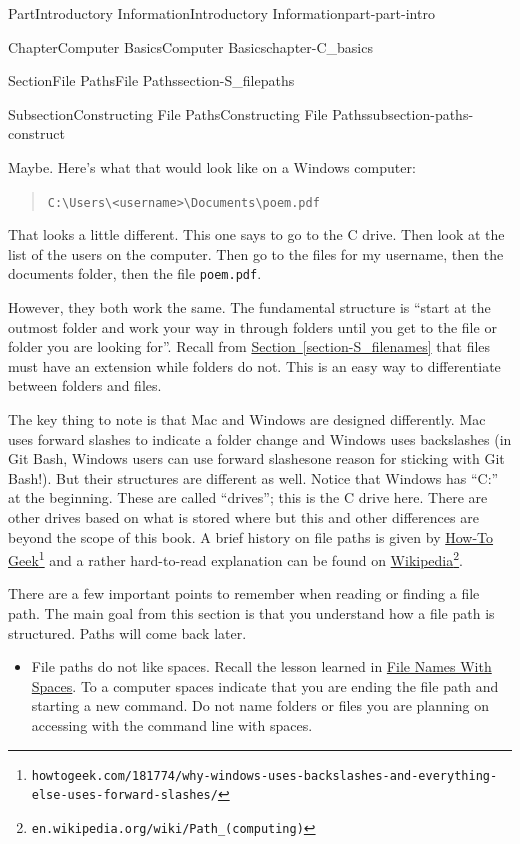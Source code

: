 \documentclass[oneside,10pt,]{book}
\newcommand{\xreffont}{\relax}
\newcommand{\mono}[1]{\texttt{#1}}
\begin{document}
\begin{partptx}{Part}{Introductory Information}{}{Introductory Information}{}{}{part-part-intro}
\begin{chapterptx}{Chapter}{Computer Basics}{}{Computer Basics}{}{}{chapter-C_basics}
\begin{sectionptx}{Section}{File Paths}{}{File Paths}{}{}{section-S_filepaths}
\begin{subsectionptx}{Subsection}{Constructing File Paths}{}{Constructing File Paths}{}{}{subsection-paths-construct}
\par
Maybe. Here's what that would look like on a Windows computer:%
\begin{quote}%
\mono{C:\textbackslash{}Users\textbackslash{}<username>\textbackslash{}Documents\textbackslash{}poem.pdf}%
\end{quote}
That looks a little different. This one says to go to the C drive. Then look at the list of the users on the computer. Then go to the files for my username, then the documents folder, then the file \mono{poem.pdf}.%
\par
However, they both work the same. The fundamental structure is ``start at the outmost folder and work your way in through folders until you get to the file or folder you are looking for''. Recall from \hyperref[section-S_filenames]{Section~{\xreffont\ref{section-S_filenames}}} that files must have an extension while folders do not. This is an easy way to differentiate between folders and files.%
\par
The key thing to note is that Mac and Windows are designed differently. Mac uses forward slashes to indicate a folder change and Windows uses backslashes (in Git Bash, Windows users can use forward slashes\textellipsis{}one reason for sticking with Git Bash!). But their structures are different as well. Notice that Windows has ``C:'' at the beginning. These are called ``drives''; this is the C drive here. There are other drives based on what is stored where but this and other differences are beyond the scope of this book. A brief history on file paths is given by \href{https://www.howtogeek.com/181774/why-windows-uses-backslashes-and-everything-else-uses-forward-slashes/}{How-To Geek}\footnote{\nolinkurl{howtogeek.com/181774/why-windows-uses-backslashes-and-everything-else-uses-forward-slashes/}\label{fn-paths-construct-l-e}} and a rather hard-to-read explanation can be found on \href{https://en.wikipedia.org/wiki/Path_(computing)}{Wikipedia}\footnote{\nolinkurl{en.wikipedia.org/wiki/Path_(computing)}\label{fn-paths-construct-l-g}}.%
\par
There are a few important points to remember when reading or finding a file path. The main goal from this section is that you understand how a file path is structured. Paths will come back later.%
\begin{itemize}[label=\textbullet]
\item{}File paths do not like spaces. Recall the lesson learned in \hyperlink{paragraphs-namesspaces}{File Names With Spaces}. To a computer spaces indicate that you are ending the file path and starting a new command. Do not name folders or files you are planning on accessing with the command line with spaces.%

\end{itemize}
\end{subsectionptx}
\end{sectionptx}
\end{chapterptx}
\end{partptx}
\end{document}
